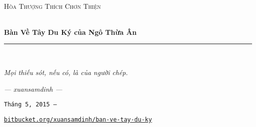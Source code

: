 \begin{titlepage}
\begin{center}
~\\
\textsc{Hòa Thượng Thích Chơn Thiện}
\vspace{3.5cm}

\HRule \\[0.5cm]
\textbf{\Huge{Bàn Về Tây Du Ký của Ngô Thừa Ân}}\\[0.5cm]
\rule{\linewidth}{0.5pt}\\[1cm]


\end{center}

\vfill
\hfill
\begin{minipage}{0.4\textwidth}
\begin{flushright}
\emph{Mọi thiếu sót, nếu có, là của người chép.}

\emph{--- xuansamdinh ---}

\texttt{Tháng 5, 2015 ---}
\end{flushright}
\end{minipage}

\begin{flushright}
\href{https://bitbucket.org/xuansamdinh/ban-ve-tay-du-ky}{\texttt{bitbucket.org/xuansamdinh/ban-ve-tay-du-ky}}
\end{flushright}
\end{titlepage}
